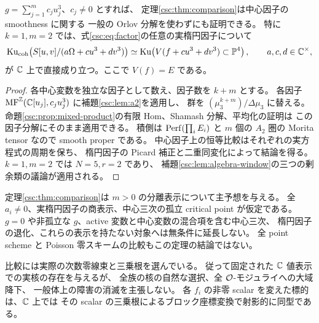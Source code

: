 \begin{corollary}[独立な中心立方項と最小の三様体例]
\label{csc:cor:fermat}
$g=\sum_{j=1}^mc_ju_j^3$、$c_j\ne0$ とすれば、
定理\ref{csc:thm:comparison}は中心因子の smoothness に関する
一般の Orlov 分解を使わずにも証明できる。
特に $k=1,m=2$ では、式\eqref{csc:eq:factor}の任意の実楕円因子について
\[
 \operatorname{Ku}_{\mathrm{coh}}\!\left(
    S[u,v]/(a\Omega+cu^3+dv^3)\right)
   \simeq
 \operatorname{Ku}\!\left(V(f+cu^3+dv^3)\subset\mathbb P^4\right),
 \qquad a,c,d\in\mathbb C^\times,
\]
が $\mathbb C$ 上で直接成り立つ。ここで $V(f)=E$ である。
\end{corollary}
\begin{proof}
各中心変数を独立な因子として数え、因子数を $k+m$ とする。
各因子 $\operatorname{MF}^{\mathbb Z}(\mathbb C[u_j],c_ju_j^3)$ に補題\ref{csc:lem:a2}を適用し、
群を $(\mu_3^{k+m})/\Delta\mu_3$ に替える。
命題\ref{csc:prop:mixed-product}の有限 Hom、Shamash 分解、平均化の証明は
この因子分解にそのまま適用できる。
積側は $\operatorname{Perf}(\prod_iE_i)$ と $m$ 個の $A_2$ 圏の Morita tensor なので smooth proper である。
中心因子上の恒等比較はそれぞれの実方程式の周期を保ち、
楕円因子の Picard 補正と二重同変化によって結論を得る。
$k=1,m=2$ では $N=5,r=2$ であり、
補題\ref{csc:lem:algebra-window}の三つの剰余類の議論が適用される。
\end{proof}

\begin{remark}[存在結果の範囲]
\label{csc:rem:scope}
定理\ref{csc:thm:comparison}は $m>0$ の分離表示について主予想を与える。
全 $a_i\ne0$、実楕円因子の商表示、中心三次の孤立 critical point が仮定である。
$g=0$ や非孤立な $g$、active 変数と中心変数の混合項を含む中心三次、
楕円因子の退化、これらの表示を持たない対象へは無条件に延長しない。
全 point scheme と Poisson 零スキームの比較もこの定理の結論ではない。

比較には実際の次数零線束と三乗根を選んでいる。
従って固定された $\mathbb C$ 値表示での実核の存在を与えるが、
全族の核の自然な選択、全 $\mathcal O$-モジュライへの大域降下、
一般体上の障害の消滅を主張しない。
各 $f_i$ の非零 scalar を変えた標的は、$\mathbb C$ 上では
その scalar の三乗根によるブロック座標変換で射影的に同型である。
\end{remark}

